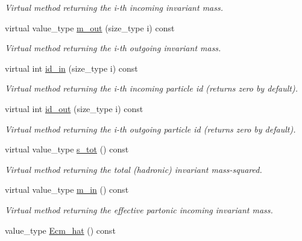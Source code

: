 \begin{DoxyCompactItemize}
\begin{DoxyCompactList}\small\item\em Virtual method returning the i-\/th incoming invariant mass. \end{DoxyCompactList}\item 
\hypertarget{a00451_a72ab870e1cdff092a9102b346783f268}{}virtual value\+\_\+type \hyperlink{a00451_a72ab870e1cdff092a9102b346783f268}{m\+\_\+out} (size\+\_\+type i) const \label{a00451_a72ab870e1cdff092a9102b346783f268}

\begin{DoxyCompactList}\small\item\em Virtual method returning the i-\/th outgoing invariant mass. \end{DoxyCompactList}\item 
virtual int \hyperlink{a00451_a93226df13fcf52eb52b5b8d894885462}{id\+\_\+in} (size\+\_\+type i) const 
\begin{DoxyCompactList}\small\item\em Virtual method returning the i-\/th incoming particle id (returns zero by default). \end{DoxyCompactList}\item 
virtual int \hyperlink{a00451_a30cad3b16698c3d0d47d01b0a2d61df2}{id\+\_\+out} (size\+\_\+type i) const 
\begin{DoxyCompactList}\small\item\em Virtual method returning the i-\/th outgoing particle id (returns zero by default). \end{DoxyCompactList}\item 
\hypertarget{a00451_a23b8eb4a43103ad601f6e46c6f6c6736}{}virtual value\+\_\+type \hyperlink{a00451_a23b8eb4a43103ad601f6e46c6f6c6736}{s\+\_\+tot} () const \label{a00451_a23b8eb4a43103ad601f6e46c6f6c6736}

\begin{DoxyCompactList}\small\item\em Virtual method returning the total (hadronic) invariant mass-\/squared. \end{DoxyCompactList}\item 
virtual value\+\_\+type \hyperlink{a00451_afd27172358507361cd4ff02f4d473119}{m\+\_\+in} () const 
\begin{DoxyCompactList}\small\item\em Virtual method returning the effective partonic incoming invariant mass. \end{DoxyCompactList}\item 
\hypertarget{a00451_a0091b3bb36d3c8e0466b153422041c88}{}value\+\_\+type \hyperlink{a00451_a0091b3bb36d3c8e0466b153422041c88}{Ecm\+\_\+hat} () const \label{a00451_a0091b3bb36d3c8e0466b153422041c88}


\end{DoxyCompactItemize}
